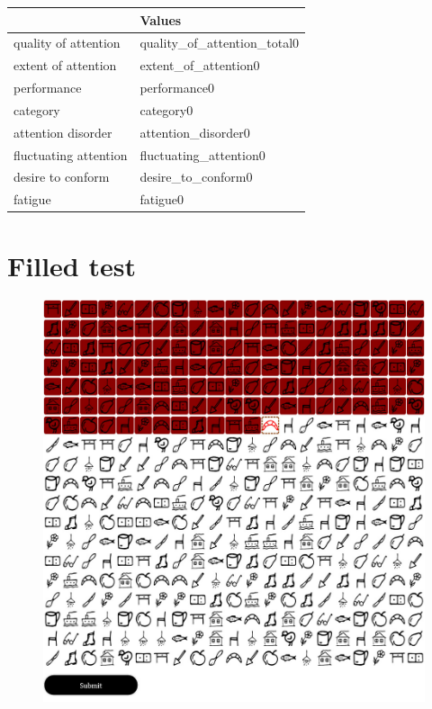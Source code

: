 \documentclass[12pt,a4paper]{article}
\begin{document}
\begin{table}[htbp]
\footnotesize

\begin{tabulary}{\linewidth}{|L|L|}
\hline
 &  Values  \\
\hline
quality of attention & quality_of_attention_total0 \\
\hline
extent of attention & extent_of_attention0 \\
\hline
performance & performance0  \\
\hline
category & category0  \\
\hline
attention disorder & attention_disorder0  \\
\hline
fluctuating attention & fluctuating_attention0  \\
\hline
desire to conform & desire_to_conform0  \\
\hline
fatigue & fatigue0  \\
\hline
\end{tabulary}
\label{tab:team}
\end{table}%

\textblockorigin{-18pt}{-2pt}

\newpage

\section*{Filled test}


\begin{figure}[!h]
    \centering
    \includegraphics[scale=0.4]{kitoltott}
\end{figure}
\end{document}
